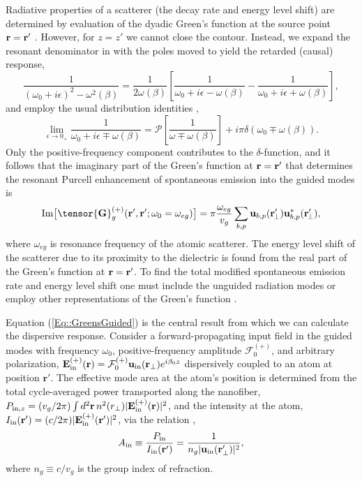 \documentclass[preprint, aps,pra,onecolumn]{revtex4-1} %
\newcommand{\inp}{{\rm in}}
\newcommand{\Eamp}{\mathcal{F}_0^{(+)}}
\begin{document}
Radiative properties of a scatterer (the decay rate and energy level shift) are determined by evaluation of the dyadic Green's function at the source point $\mathbf{r} = \mathbf{r}'$ \cite{fussell_decay_2005}.  However, for $z=z'$ we cannot close the contour. Instead, we expand the resonant denominator in  with the poles moved to yield the retarded (causal) response,
\begin{equation}
\frac{1}{(\omega_0+i\epsilon)^2-\omega^2(\beta)}=\frac{1}{2 \omega(\beta)}\left[ \frac{1}{\omega_0+ i 
\epsilon - \omega(\beta)} - \frac{1}{\omega_0+ i \epsilon + \omega(\beta)} \right],
\end{equation}
 and employ the usual distribution identities \cite{sondergaard_general_2001},
\begin{equation}
\lim_{\epsilon \rightarrow 0_+} \frac{1}{\omega_0 + i \epsilon \mp 
\omega(\beta)}=\mathcal{P}\left[\frac{1}{\omega \mp \omega(\beta)} \right] + i \pi \delta (\omega_0 \mp 
\omega(\beta)).
\end{equation}
Only the positive-frequency component contributes to the $\delta$-function, and it follows that the imaginary part of the Green's function at $\mathbf{r} = \mathbf{r}'$ that determines the resonant Purcell enhancement of spontaneous emission into the guided modes is \cite{dung_spontaneous_2000, fussell_decay_2005, chen_finite-element_2010}
	\begin{equation}\label{Eq::ImGreenLocal}
		{\rm Im} \big[\tensor{\mathbf{G}}^{(+)}_g(\br',\br'; \omega_0=\omega_{eg}) \big] = \pi \frac{\omega_{eg}}{v_g } \sum_{b, p} 
		\mathbf{u}_{b, p} (\br_{\!\perp}^\prime)\mathbf{u}^*_{b , p} (\br_{\!\perp}^\prime),
	\end{equation}
where $\omega_{eg}$ is resonance frequency of the atomic scatterer.  The energy level shift of the scatterer due to its proximity to the dielectric is found from the real part of the Green's function at $\mathbf{r} = \mathbf{r}'$. 
To find the total modified spontaneous emission rate and energy level shift one must include the unguided radiation modes \cite{le_kien_spontaneous_2005} or employ other representations of the Green's function \cite{klimov_spontaneous_2004}.  

Equation (\ref{Eq::GreensGuided}) is the central result from which we can calculate the dispersive response.  Consider a forward-propagating input field in the guided modes with frequency $\omega_0$, positive-frequency amplitude $\Eamp$, and arbitrary polarization, $\mathbf{E}^{(+)}_{\inp}(\br) = \Eamp  \mathbf{u}_{\rm in}(\br_\perp) e^{i \beta_0 z}$ dispersively coupled to an atom at position $\mathbf{r}'$.  The effective mode area at the atom's position is determined from the total cycle-averaged power transported along the nanofiber, $P_{{\rm in},z} = (v_g/2\pi) \int d^2\br \, n^2(r_\perp) |\mathbf{E}^{(+)}_{\inp}(\br) |^2$, and the intensity at the atom, $I_{\rm in}(\mathbf{r}') = (c/2\pi) |\mathbf{E}^{(+)}_{\inp}(\br') |^2$, via the relation \cite{domokos_quantum_2002},
 	\begin{align} \label{Eq::AreaIn}
 		A_{\rm in} \equiv \frac{P_{{\rm in}}}{I_{\rm in}(\mathbf{r}')} = \frac{1}{n_g |\mathbf{u}_{\rm in}(\mathbf{r}'_\perp)|^{2}},
	\end{align}
where $n_g\equiv c/v_g$ is the group index of refraction.    
\end{document}
